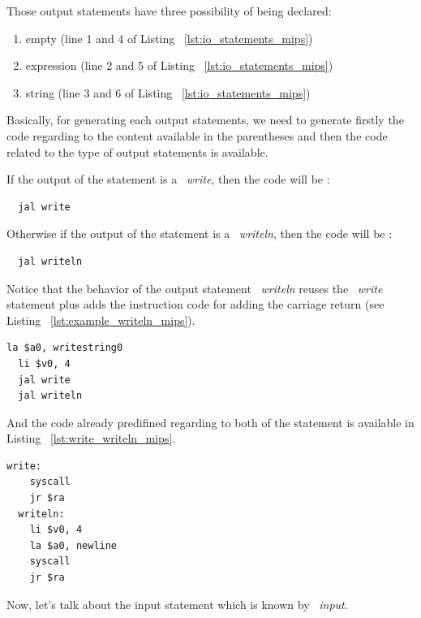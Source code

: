 \documentclass[
  oneside,
  11pt, a4paper,
  footinclude=true,
  headinclude=true,
  cleardoublepage=empty
]{scrbook}
\begin{document}
Those output statements have three possibility of being declared:

\begin{enumerate}
\item empty (line 1 and 4 of Listing ~\ref{lst:io_statements_mips})
\item expression (line 2 and 5 of Listing ~\ref{lst:io_statements_mips})
\item string (line 3 and 6 of Listing ~\ref{lst:io_statements_mips})
\end{enumerate}

Basically, for generating each output statements, we need to generate firstly the code regarding to the content available in the parentheses and then the code related to the type of output statements is available.

If the output of the statement is a ~\textit{write}, then the code will be :

\begin{lstlisting}
  jal write
\end{lstlisting}

Otherwise if the output of the statement is a ~\textit{writeln}, then the code will be :

\begin{lstlisting}	
  jal writeln
\end{lstlisting}

Notice that the behavior of the output statement ~\textit{writeln} reuses the ~\textit{write} statement plus adds the instruction code for adding the carriage return (see Listing ~\ref{lst:example_writeln_mips}).

\begin{lstlisting}[caption={Code generated for line 6 in Listing ~\ref{lst:io_statements_mips}},label={lst:example_writeln_mips}]
  la $a0, writestring0
  li $v0, 4
  jal write	
  jal writeln
\end{lstlisting}

And the code already predifined regarding to both of the statement is available in Listing ~\ref{lst:write_writeln_mips}.

\begin{lstlisting}[caption={MIPS assembly code of write and writeln},label={lst:write_writeln_mips}]
  write: 
	syscall
	jr $ra
  writeln: 
	li $v0, 4
	la $a0, newline
	syscall
	jr $ra
\end{lstlisting}

Now, let's talk about the input statement which is known by ~\textit{input}.
\end{document}
